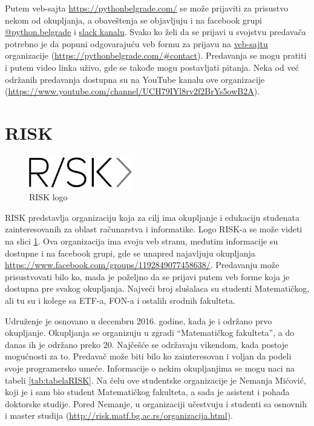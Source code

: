 \documentclass[a4paper]{article}
\begin{document}
{Putem veb-sajta \url{https://pythonbelgrade.com/} se može prijaviti za prisustvo nekom od okupljanja, a obaveštenja se objavljuju i na facebook grupi \href{https://www.facebook.com/python.belgrade/}{@python.belgrade} i \href{https://pythonbelgrade.slack.com/join/shared_invite/enQtNTM0OTI4NzY3NDI2LTk2OThkNjQ2YmM5NWNkNTBjMjU3NDY0NjcyNDFiYmZmNjQ4MDE3NjczYWM0NTk1YWVlYzlhNGIwYjU3NjA3Y2Y}{slack kanalu}. Svako ko želi da se prijavi u svojstvu predavača potrebno je da popuni odgovarajuću veb formu za prijavu na \href{https://pythonbelgrade.com/}{veb-sajtu} organizacije (\url{https://pythonbelgrade.com/#contact}). Predavanja se mogu pratiti i putem video linka uživo, gde se takođe mogu postavljati pitanja. Neka od već održanih predavanja dostupna su na YouTube kanalu ove organizacije (\url{https://www.youtube.com/channel/UCH79IYl8rv2f2BrYs5owB2A}).


\section{RISK}
\label{sec:riskmatf}

\begin{figure}[h!]
  \centering
  \includegraphics[width=0.4\textwidth]{riskmatf.png}
  \caption{RISK logo}
  \label{fig:RISKlogo}
\end{figure}

RISK predstavlja organizaciju koja za cilj ima okupljanje i edukaciju studenata zainteresovanih za oblast računarstva i informatike. \cite{aboutRisk}
Logo RISK-a se može videti na slici \ref{fig:RISKlogo}. Ova organizacija ima svoju veb stranu, međutim informacije su dostupne i na facebook grupi, gde se unapred najavljuju okupljanja \url{https://www.facebook.com/groups/1192849077458638/}. Predavanju može prisustvovati bilo ko, mada je poželjno da se prijavi putem veb forme koja je dostupna pre svakog okupljanja. Najveći broj slušalaca su
studenti Matematičkog, ali tu su i kolege sa ETF-a, FON-a i ostalih srodnih fakulteta.

Udruženje je osnovano u decembru 2016. godine, kada je i održano prvo okupljanje. Okupljanja se organizuju u zgradi ``Matematičkog fakulteta'', a do danas ih je održano preko 20. Najčešće se održavaju vikendom, kada postoje mogućnosti za to. Predavač može biti bilo ko zainteresovan i voljan da podeli svoje programersko umeće. Informacije o nekim okupljanjima se mogu naci na tabeli \ref{tab:tabelaRISK}. Na čelu ove studentske organizacije je Nemanja Mićović, koji je i sam bio student Matematičkog fakulteta, a sada je asistent i pohađa doktorske studije. Pored Nemanje, u organizaciji učestvuju i studenti sa osnovnih i master studija (\url{http://risk.matf.bg.ac.rs/organizacija.html}).

}
\end{document}
